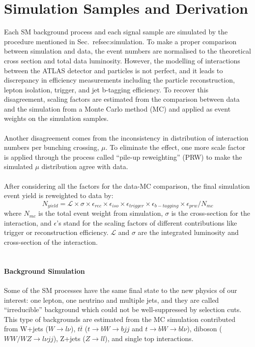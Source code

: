 \section{Simulation Samples and Derivation}
Each SM background process and each signal sample are simulated by the procedure mentioned in Sec.~ref{sec:simulation}.  To make a proper comparison between simulation and data, the event numbers are normalised to the theoretical cross section and total data luminosity. However, the modelling of interactions between the ATLAS detector and particles is not perfect, and it leads to discrepancy in efficiency measurements including the particle reconstruction, lepton isolation, trigger, and jet b-tagging efficiency. To recover this disagreement, scaling factors are estimated from the comparison between data and the simulation from a Monte Carlo method (MC) and applied as event weights on the simulation samples. 
\\
\\Another disagreement comes from the inconsistency in distribution of interaction numbers per bunching crossing, $\mu$. To eliminate the effect, one more scale factor is applied through the process called ``pile-up reweighting'' (PRW) to make the simulated $\mu$ distribution agree with data. 
\\
\\After considering all the factors for the data-MC comparison, the final simulation event yield is reweighted to data by:
\begin{equation}
N_{yield} = \mathcal{L}\times \sigma \times \epsilon_{rec} \times \epsilon_{iso} \times \epsilon_{trigger} \times \epsilon_{b-tagging} \times \epsilon_{prw} / N_{mc}
\end{equation}
where $N_{mc}$ is the total event weight from simulation, $\sigma$ is the cross-section for the interaction, and $\epsilon$'s stand for the scaling factors of different contributions like trigger or reconstruction efficiency. $\mathcal{L}$ and $\sigma$ are the integrated luminosity and cross-section of the interaction.
\\
\\
\\{\bf Background Simulation}
\\
\\Some of the SM processes have the same final state to the new physics of our interest: one lepton, one neutrino and multiple jets, and they are called ``irreducible'' background which could not be well-suppressed by selection cuts. This type of backgrounds are estimated from the MC simulation contributed from W+jets ($W\rightarrow l\nu$), $t\bar{t}$ ($t\rightarrow bW \rightarrow bjj$ and $t\rightarrow bW \rightarrow bl\nu$), diboson ($WW/WZ\rightarrow l\nu jj$), Z+jets ($Z\rightarrow ll$), and single top interactions.  

